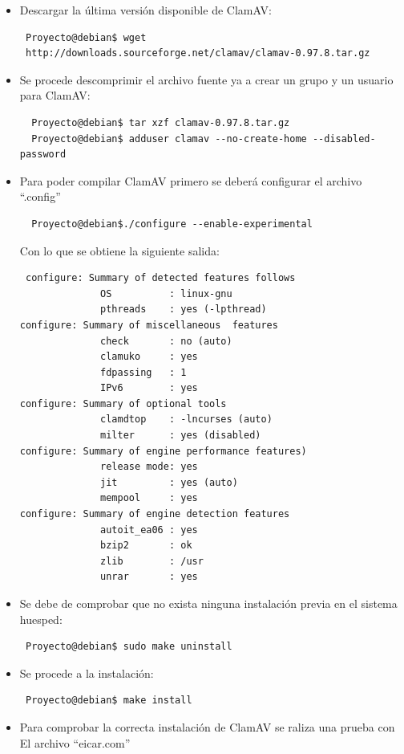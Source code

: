 \begin{itemize}
 \item Descargar la \'ultima  versi\'on disponible de ClamAV:
 \begin{verbatim}
 Proyecto@debian$ wget 
 http://downloads.sourceforge.net/clamav/clamav-0.97.8.tar.gz
 \end{verbatim}
 \item Se procede descomprimir el archivo fuente  ya  a crear  un   grupo y un 
usuario para ClamAV:
 \begin{verbatim}
  Proyecto@debian$ tar xzf clamav-0.97.8.tar.gz
  Proyecto@debian$ adduser clamav --no-create-home --disabled-password
 \end{verbatim}
 
  \item Para poder compilar ClamAV primero se deber\'a configurar el archivo 
``.config''
 \begin{verbatim}
  Proyecto@debian$./configure --enable-experimental
 \end{verbatim}
 Con lo que se obtiene la siguiente salida:
 
 \begin{verbatim}
 configure: Summary of detected features follows
              OS          : linux-gnu
              pthreads    : yes (-lpthread)
configure: Summary of miscellaneous  features
              check       : no (auto)
              clamuko     : yes
              fdpassing   : 1
              IPv6        : yes
configure: Summary of optional tools
              clamdtop    : -lncurses (auto)
              milter      : yes (disabled)
configure: Summary of engine performance features)
              release mode: yes
              jit         : yes (auto)
              mempool     : yes
configure: Summary of engine detection features
              autoit_ea06 : yes
              bzip2       : ok
              zlib        : /usr
              unrar       : yes
 \end{verbatim}

\item Se debe de comprobar que no   exista  ninguna   instalación previa en el 
sistema huesped:
\begin{verbatim}
 Proyecto@debian$ sudo make uninstall
\end{verbatim}
\item Se procede a la instalación:
\begin{verbatim}
 Proyecto@debian$ make install
\end{verbatim}
\item Para comprobar la correcta instalación de ClamAV se raliza una prueba con 
El archivo ``eicar.com''

\begin{verbatim}
 
\end{verbatim}


\end{itemize}

